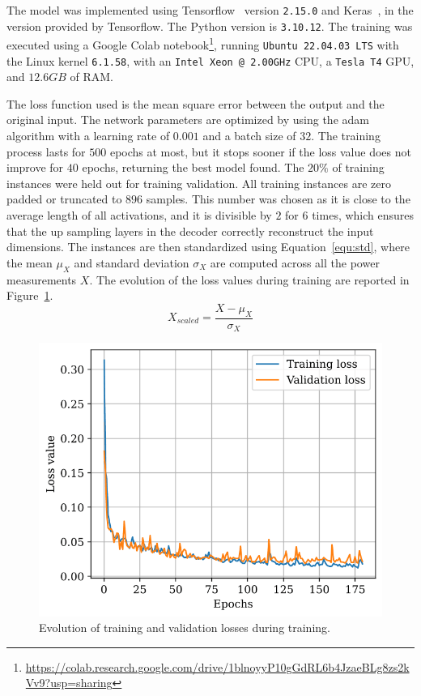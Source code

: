 The model was implemented using Tensorflow~\parencite{abadi_tensorflow_2016,tensorflow_developers_tensorflow_2023} version \texttt{2.15.0} and Keras~\parencite{chollet_keras_2015}, in the version provided by Tensorflow. The Python version is \texttt{3.10.12}. The training was executed using a Google Colab notebook\footnote{\url{https://colab.research.google.com/drive/1blnoyyP10gGdRL6b4JzaeBLg8zs2kVv9?usp=sharing}}, running \texttt{Ubuntu 22.04.03 LTS} with the Linux kernel \texttt{6.1.58}, with an \texttt{Intel Xeon @ 2.00GHz} CPU, a \texttt{Tesla T4} GPU, and $12.6GB$ of RAM.

The loss function used is the mean square error between the output and the original input. The network parameters are optimized by using the \acrfull{adam} algorithm with a learning rate of $0.001$ and a batch size of $32$. The training process lasts for $500$ epochs at most, but it stops sooner if the loss value does not improve for $40$ epochs, returning the best model found. The $20\%$ of training instances were held out for training validation. All training instances are zero padded or truncated to $896$ samples. This number was chosen as it is close to the average length of all activations, and it is divisible by $2$ for $6$ times, which ensures that the up sampling layers in the decoder correctly reconstruct the input dimensions. The instances are then standardized using Equation~\eqref{equ:std}, where the mean $\mu_X$ and standard deviation $\sigma_X$ are computed across all the power measurements $X$. The evolution of the loss values during training are reported in Figure~\ref{fig:autoencoder_losses}.
\begin{equation}\label{equ:std}
    X_{scaled} = \frac{X - \mu_X}{\sigma_X}
\end{equation}

\begin{figure}
    \centering
    \includegraphics[width=.6\linewidth]{images/loss.png}
    \caption{Evolution of training and validation losses during training.}
    \label{fig:autoencoder_losses}
\end{figure}

